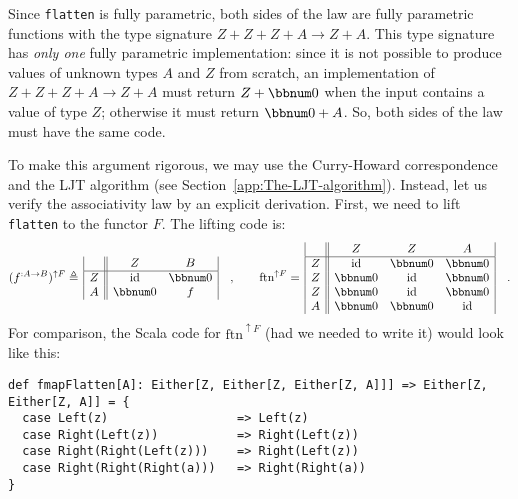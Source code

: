 Since \lstinline!flatten! is fully parametric, both sides of the
law are fully parametric functions with the type signature $Z+Z+Z+A\rightarrow Z+A$.
This type signature has \emph{only one} fully parametric implementation:
since it is not possible to produce values of unknown types $A$ and
$Z$ from scratch, an implementation of $Z+Z+Z+A\rightarrow Z+A$
must return $Z+\bbnum 0$ when the input contains a value of type
$Z$; otherwise it must return $\bbnum 0+A$. So, both sides of the
law must have the same code. 

To make this argument rigorous, we may use the Curry-Howard correspondence
and the LJT algorithm (see Section~\ref{app:The-LJT-algorithm}).
Instead, let us verify the associativity law by an explicit derivation.
First, we need to lift \lstinline!flatten! to the functor $F$. The
lifting code is:
\[
(f^{:A\rightarrow B})^{\uparrow F}\triangleq\,\begin{array}{|c||cc|}
 & Z & B\\
\hline Z & \text{id} & \bbnum 0\\
A & \bbnum 0 & f
\end{array}\quad,\quad\quad\text{ftn}^{\uparrow F}=\,\begin{array}{|c||ccc|}
 & Z & Z & A\\
\hline Z & \text{id} & \bbnum 0 & \bbnum 0\\
Z & \bbnum 0 & \text{id} & \bbnum 0\\
Z & \bbnum 0 & \text{id} & \bbnum 0\\
A & \bbnum 0 & \bbnum 0 & \text{id}
\end{array}\quad.
\]
For comparison, the Scala code for $\text{ftn}^{\uparrow F}$ (had
we needed to write it) would look like this:
\begin{lstlisting}
def fmapFlatten[A]: Either[Z, Either[Z, Either[Z, A]]] => Either[Z, Either[Z, A]] = {
  case Left(z)                  => Left(z)
  case Right(Left(z))           => Right(Left(z))
  case Right(Right(Left(z)))    => Right(Left(z))
  case Right(Right(Right(a)))   => Right(Right(a))
}
\end{lstlisting}

